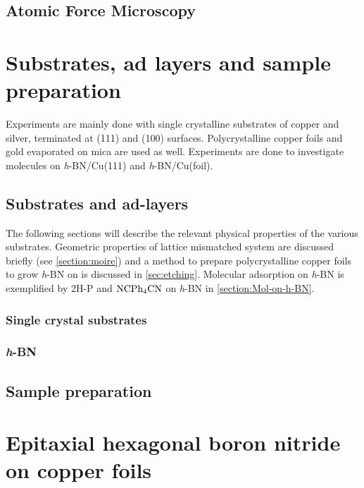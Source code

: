 \documentclass[
twoside,				%
BCOR=12mm,				%
headings=normal,		%
headsepline,			%
footsepline,			%
plainfootsepline,		%
]{scrbook}
\begin{document}
  \section{\textbf{A}tomic \textbf{F}orce \textbf{M}icroscopy}
  \label{section:afm}
	

\chapter{Substrates, ad layers and sample preparation}
 Experiments are mainly done with single crystalline substrates of copper and silver, terminated at (111) and (100) surfaces. Polycrystalline copper foils and gold evaporated on mica are used as well. Experiments are done to investigate molecules on \textit{h}-BN/Cu(111) and \textit{h}-BN/Cu(foil).
 
  \section{Substrates and ad-layers}
The following sections will describe the relevant physical properties of the various substrates. Geometric properties of lattice mismatched system are discussed briefly (see \autoref{section:moire}) and a method to prepare polycrystalline copper foils to grow \textit{h}-BN on is discussed in \autoref{sec:etching}. Molecular adsorption on \textit{h}-BN is exemplified by 2H-P and $\textnormal{NC}\textnormal{Ph}_4\textnormal{CN}$ on \textit{h}-BN in \autoref{section:Mol-on-h-BN}.

     \subsection{Single crystal substrates}
        

     \subsection{\textit{h}-BN}
		

  \section{Sample preparation}
    

\chapter{Epitaxial hexagonal boron nitride on copper foils}
%

\end{document}
